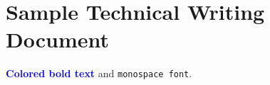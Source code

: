 \documentclass{article}
\begin{document}
\section{Sample Technical Writing Document}
\textcolor{blue}{\textbf{Colored bold text}} and \texttt{monospace font}.
\end{document}
